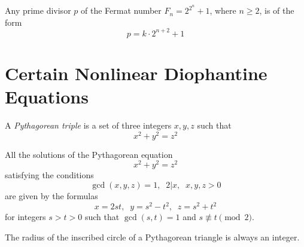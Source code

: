\documentclass{article}
\newcounter{theorem}[section]
\newcounter{definition}[section]
\begin{document}
\begin{theorem}
  \label{thm:form-of-a-prime-divisor-of-a-fermat-number}
Any prime divisor $p$ of the Fermat number $F_n = 2^{2^n} + 1$, where $n \geq 2$, is of the form
\begin{equation}
  p = k \cdot 2^{n+2} + 1
\end{equation}
\end{theorem}

\section{Certain Nonlinear Diophantine Equations}

\begin{definition}
  \label{def:pythagorean-triple}
A \textit{Pythagorean triple} is a set of three integers $x, y, z$ such that 
\begin{equation}
  x^2 + y^2 = z^2
\end{equation}
\end{definition}

\begin{theorem}
  \label{thm:parameterization-of-primitive-pythagorean}
All the solutions of the Pythagorean equation
\begin{equation}
  x^2 + y^2 = z^2
\end{equation}
satisfying the conditions 
\begin{equation}
  \gcd(x, y, z) = 1, \;\; 2 \big| x, \;\; x, y, z > 0
\end{equation}
are given by the formulas 
\begin{equation}
  x = 2st, \;\; y = s^2 - t^2, \;\; z= s^2 + t^2
\end{equation}
for integers $s > t > 0$ such that $\gcd(s, t) = 1$ and $s \not\equiv t \pmod{2}$. 
\end{theorem}

\begin{corollary}
  \label{thm:integrality-of-the-inradius-of-a-pythagorean}
The radius of the inscribed circle of a Pythagorean triangle is always an integer. 
\end{corollary}
\end{document}
